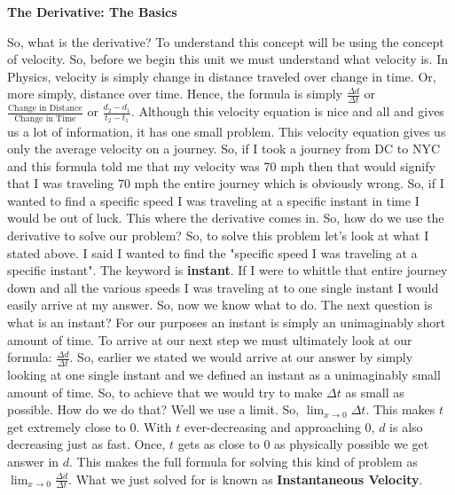 \documentclass{article}
\begin{document}
\begin{center}
    \textbf{The Derivative: The Basics}
\end{center}
So, what is the derivative? To understand this concept will be using the concept of velocity. So, before we begin this unit we must understand what velocity is.
\newline
\newline
In Physics, velocity is simply change in distance traveled over change in time. Or, more simply, distance over time. Hence, the formula is simply $\frac{\Delta d}{\Delta t}$ or $\frac{\text{Change in Distance}}{\text{Change in Time}}$ or $\frac{d_2 - d_1}{t_2 - t_1}$.
\newline
\newline
Although this velocity equation is nice and all and gives us a lot of information, it has one small problem. This velocity equation gives us only the average velocity on a journey. So, if I took a journey from DC to NYC and this formula told me that my velocity was 70 mph then that would signify that I was traveling 70 mph the entire journey which is obviously wrong. So, if I wanted to find a specific speed I was traveling at a specific instant in time I would be out of luck. This where the derivative comes in. So, how do we use the derivative to solve our problem?
\newline
\newline
So, to solve this problem let's look at what I stated above. I said I wanted to find the "specific speed I was traveling at a specific instant". The keyword is \textbf{instant}. If I were to whittle that entire journey down and all the various speeds I was traveling at to one single instant I would easily arrive at my answer. So, now we know what to do. The next question is what is an instant? For our purposes an instant is simply an unimaginably short amount of time. To arrive at our next step we must ultimately look at our formula: $\frac{\Delta d}{\Delta t}$.
\newline
\newline
So, earlier we stated we would arrive at our answer by simply looking at one single instant and we defined an instant as a unimaginably small amount of time. So, to achieve that we would try to make $\Delta t$ as small as possible. How do we do that? Well we use a limit. So, $\lim_{x\to 0}\Delta t$. This makes $t$ get extremely close to 0. With $t$ ever-decreasing and approaching 0, $d$ is also decreasing just as fast. Once, $t$ gets as close to 0 as physically possible we get answer in $d$. This makes the full formula for solving this kind of problem as $\lim_{x\to 0} \frac{\Delta d}{\Delta t}$. What we just solved for is known as \textbf{Instantaneous Velocity}. 
\end{document}
